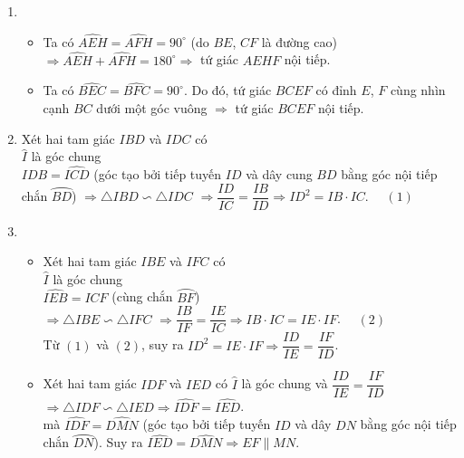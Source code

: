 \begin{ex}
{\begin{center}
		\end{center}
		\begin{enumerate}
			\item 
			\begin{itemize}
				\item Ta có $\widehat {AEH} = \widehat {AFH}=90^\circ$ (do $BE$, $CF$ là đường cao)\\ 
				$\Rightarrow \widehat {AEH} + \widehat {AFH}=180^\circ \Rightarrow$ tứ giác $AEHF$ nội tiếp.
				\item Ta có $\widehat {BEC} = \widehat {BFC}=90^\circ$. Do đó, tứ giác $BCEF$ có đỉnh $E$, $F$ cùng nhìn cạnh $BC$ dưới một góc vuông $\Rightarrow$ tứ giác $BCEF$ nội tiếp.
			\end{itemize}
			\item Xét hai tam giác $IBD$ và $IDC$ có\\
			$\widehat I$ là góc chung\\
			$\widehat{IDB}=\widehat{ICD}$ (góc tạo bởi tiếp tuyến $ID$ và dây cung $BD$ bằng góc nội tiếp chắn $\wideparen{BD}$)
			$\Rightarrow \triangle {IBD}\backsim \triangle {IDC}$
			$\Rightarrow \dfrac{ID}{IC}=\dfrac{IB}{ID} \Rightarrow ID^2=IB\cdot IC$. $\quad (1)$
			\item 
			\begin{itemize}
				\item Xét hai tam giác $IBE$ và $IFC$ có\\
				$\widehat I$ là góc chung\\
				$\widehat{IEB}=\widehat{ICF}$ (cùng chắn $\wideparen{BF}$)\\
				$\Rightarrow \triangle {IBE}\backsim \triangle {IFC}$ $\Rightarrow \dfrac{IB}{IF}=\dfrac{IE}{IC} \Rightarrow IB\cdot IC = IE\cdot IF$. $\quad (2)$\\
				Từ $(1)$ và $(2)$, suy ra $ID^2=IE\cdot IF \Rightarrow \dfrac{ID}{IE}=\dfrac{IF}{ID}$.
				\item Xét hai tam giác $IDF$ và $IED$ có $\widehat I$ là góc chung và
				$\dfrac{ID}{IE}=\dfrac{IF}{ID}$\\
				$\Rightarrow \triangle {IDF}\backsim \triangle {IED} 
				\Rightarrow \widehat{IDF}=\widehat{IED}$.\\
				mà $\widehat{IDF}=\widehat{DMN}$ (góc tạo bởi tiếp tuyến $ID$ và dây $DN$ bằng góc nội tiếp chắn $\wideparen{DN}$).
				Suy ra $\widehat{IED}=\widehat{DMN} \Rightarrow EF \parallel MN$.			
			\end{itemize}			
		\end{enumerate}
	}
\end{ex}

\begin{multicols}{10}
	
\end{multicols}